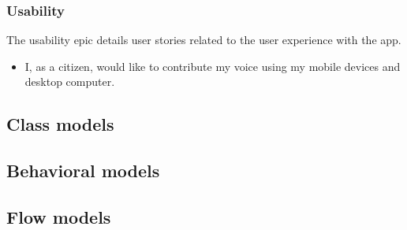 \subsubsection{Usability}

The usability epic details user stories related to the user experience with the app.

\begin{itemize}
    \item I, as a citizen, would like to contribute my voice using my mobile devices and desktop computer.
\end{itemize}

\subsection{Class models}

\subsection{Behavioral models}

\subsection{Flow models}

 
